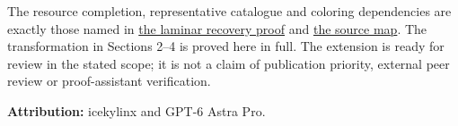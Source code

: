 The resource completion, representative catalogue and coloring dependencies are exactly those named in \href{https://github.com/icekylinx/algorithm-frontier/blob/main/problems/weighted-prefix-quota-frontier/manuscripts/laminar-dominant-weight-recovery.md}{the laminar recovery proof} and \href{https://github.com/icekylinx/algorithm-frontier/blob/main/problems/weighted-prefix-quota-frontier/sources.md}{the source map}. The transformation in Sections 2--4 is proved here in full. The extension is ready for review in the stated scope; it is not a claim of publication priority, external peer review or proof-assistant verification.

\textbf{Attribution:} icekylinx and GPT-6 Astra Pro.
